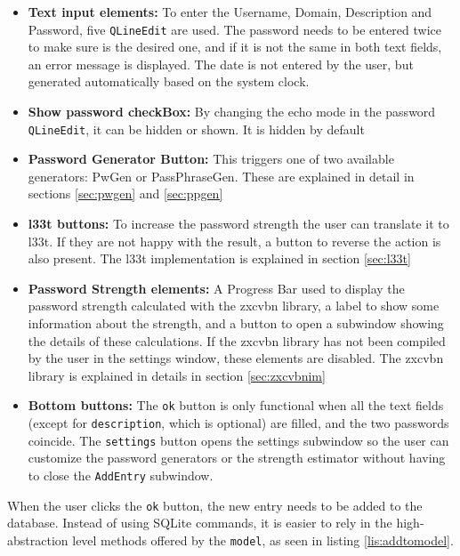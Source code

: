 \begin{itemize}
\setlength\itemsep{-3pt}

\item \textbf{Text input elements: }To enter the Username, Domain, Description and Password, five \texttt{QLineEdit} are used. The password needs to be entered twice to make sure is the desired one, and if it is not the same in both text fields, an error message is displayed. The date is not entered by the user, but generated automatically based on the system clock.
\item \textbf{Show password checkBox: }By changing the echo mode in the password \texttt{QLineEdit}, it can be hidden or shown. It is hidden by default
\item \textbf{Password Generator Button: }This triggers one of two available generators: PwGen or PassPhraseGen. These are explained in detail in sections \ref{sec:pwgen} and \ref{sec:ppgen}
\item \textbf{l33t buttons: }To increase the password strength the user can translate it to l33t. If they are not happy with the result, a button to reverse the action is also present. The l33t implementation is explained in section \ref{sec:l33t}
\item \textbf{Password Strength elements: } A Progress Bar used to display the password strength calculated with the zxcvbn library, a label to show some information about the strength, and a button to open a subwindow showing the details of these calculations. If the zxcvbn library has not been compiled by the user in the settings window, these elements are disabled. The zxcvbn library is explained in details in section  \ref{sec:zxcvbnim}
\item \textbf{Bottom buttons: }The \texttt{ok} button is only functional when all the text fields (except for \texttt{description}, which is optional) are filled, and the two passwords coincide. The \texttt{settings} button opens the settings subwindow so the user can customize the password generators or the strength estimator without having to close the \texttt{AddEntry} subwindow.

\end{itemize}

When the user clicks the \texttt{ok} button, the new entry needs to be added to the database. Instead of using SQLite commands, it is easier to rely in the high-abstraction level methods offered by the \texttt{model}, as seen in listing \ref{lis:addtomodel}.


